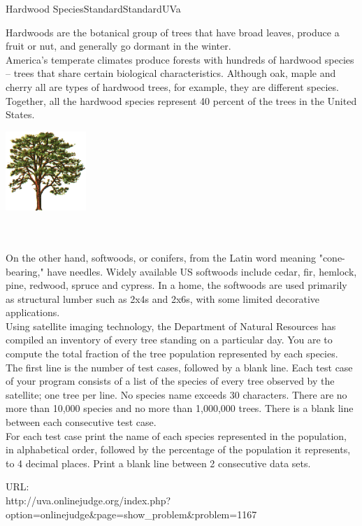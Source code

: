 \begin{problema}{Hardwood Species}{Standard}{Standard}{UVa}


\noindent\begin{minipage}{.80\textwidth}
  { 
  Hardwoods are the botanical group of trees that have broad leaves, produce a fruit or nut, and generally go dormant in the winter.\\
  
  America's temperate climates produce forests with hundreds of hardwood species -- trees that share certain biological characteristics. Although oak, maple and cherry all are types of hardwood trees, for example, they are different species. Together, all the hardwood species represent 40 percent of the trees in the United States. \\
  }
\end{minipage}%
\begin{minipage}{.20\textwidth}
  \centering
  \includegraphics[height=3cm]{Graficos/tree}
\end{minipage}
\\
\\
On the other hand, softwoods, or conifers, from the Latin word meaning "cone-bearing," have needles. Widely available US softwoods include cedar, fir, hemlock, pine, redwood, spruce and cypress. In a home, the softwoods are used primarily as structural lumber such as 2x4s and 2x6s, with some limited decorative applications. \\

Using satellite imaging technology, the Department of Natural Resources has compiled an inventory of every tree standing on a particular day. You are to compute the total fraction of the tree population represented by each species. \\

The first line is the number of test cases, followed by a blank line. Each test case of your program consists of a list of the species of every tree observed by the satellite; one tree per line. No species name exceeds 30 characters. There are no more than 10,000 species and no more than 1,000,000 trees. There is a blank line between each consecutive test case. \\

For each test case print the name of each species represented in the population, in alphabetical order, followed by the percentage of the population it represents, to 4 decimal places. Print a blank line between 2 consecutive data sets.\\

\Example



URL: \\ http://uva.onlinejudge.org/index.php?\\
option=onlinejudge\&page=show\_problem\&problem=1167

\end{problema}
